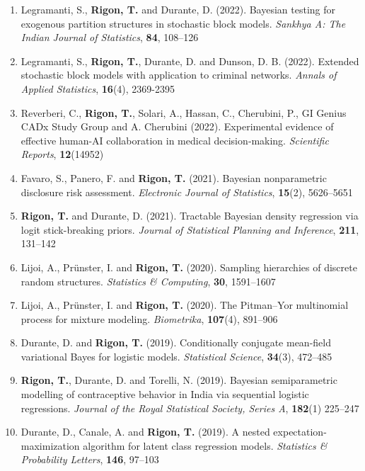 \documentclass[10pt]{article}
\begin{document}
\begin{enumerate}
\item Legramanti, S., \textbf{Rigon, T.} and Durante, D. (2022). Bayesian testing for exogenous partition structures in stochastic block models. \textit{Sankhya A: The Indian Journal of Statistics}, \textbf{84}, 108--126

\item Legramanti, S., \textbf{Rigon, T.}, Durante, D. and Dunson, D. B. (2022). Extended stochastic block models with application to criminal networks. \textit{Annals of Applied Statistics}, \textbf{16}(4), 2369-2395

\item Reverberi, C., \textbf{Rigon, T.}, Solari, A., Hassan, C., Cherubini, P., GI Genius CADx Study Group and A. Cherubini (2022). Experimental evidence of effective human-AI collaboration in medical decision‐making. \textit{Scientific Reports}, \textbf{12}(14952)

\item Favaro, S., Panero, F. and \textbf{Rigon, T.} (2021). Bayesian nonparametric disclosure risk assessment. \textit{Electronic Journal of Statistics}, \textbf{15}(2), 5626--5651

\item \textbf{Rigon, T.} and Durante, D. (2021). Tractable Bayesian density regression via logit stick-breaking priors. \textit{Journal of Statistical Planning and Inference}, \textbf{211}, 131--142

\item Lijoi, A., Pr\"unster, I. and \textbf{Rigon, T.} (2020). Sampling hierarchies of discrete random structures. \textit{Statistics \& Computing}, \textbf{30}, 1591--1607

\item Lijoi, A., Pr\"unster, I. and \textbf{Rigon, T.} (2020). The Pitman--Yor multinomial process for mixture modeling. \textit{Biometrika}, \textbf{107}(4), 891--906

\item Durante, D. and \textbf{Rigon, T.} (2019). Conditionally conjugate mean-field variational Bayes for logistic models. \textit{Statistical Science}, \textbf{34}(3), 472--485

\item \textbf{Rigon, T.}, Durante, D. and Torelli, N. (2019). Bayesian semiparametric modelling of contraceptive behavior in India via sequential logistic regressions. \textit{Journal of the Royal Statistical Society, Series A}, \textbf{182}(1) 225--247

\item Durante, D., Canale, A. and \textbf{Rigon, T.} (2019). A nested expectation-maximization algorithm for latent class regression models. \textit{Statistics \& Probability Letters}, \textbf{146}, 97--103
\setcounter{publications}{\value{enumi}}
\end{enumerate}
\end{document}
